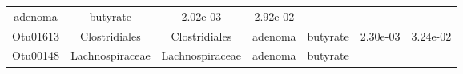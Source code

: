 \documentclass[11pt,]{article}
\begin{document}
\begin{longtable}[]{@{}ccccccc@{}}
\begin{minipage}[t]{0.09\columnwidth}
adenoma\strut
\end{minipage} & \begin{minipage}[t]{0.11\columnwidth}\centering\strut
butyrate\strut
\end{minipage} & \begin{minipage}[t]{0.09\columnwidth}\centering\strut
2.02e-03\strut
\end{minipage} & \begin{minipage}[t]{0.09\columnwidth}\centering\strut
2.92e-02\strut
\end{minipage}\tabularnewline
\begin{minipage}[t]{0.09\columnwidth}\centering\strut
Otu01613\strut
\end{minipage} & \begin{minipage}[t]{0.17\columnwidth}\centering\strut
Clostridiales\strut
\end{minipage} & \begin{minipage}[t]{0.17\columnwidth}\centering\strut
Clostridiales\strut
\end{minipage} & \begin{minipage}[t]{0.09\columnwidth}\centering\strut
adenoma\strut
\end{minipage} & \begin{minipage}[t]{0.11\columnwidth}\centering\strut
butyrate\strut
\end{minipage} & \begin{minipage}[t]{0.09\columnwidth}\centering\strut
2.30e-03\strut
\end{minipage} & \begin{minipage}[t]{0.09\columnwidth}\centering\strut
3.24e-02\strut
\end{minipage}\tabularnewline
\begin{minipage}[t]{0.09\columnwidth}\centering\strut
Otu00148\strut
\end{minipage} & \begin{minipage}[t]{0.17\columnwidth}\centering\strut
Lachnospiraceae\strut
\end{minipage} & \begin{minipage}[t]{0.17\columnwidth}\centering\strut
Lachnospiraceae\strut
\end{minipage} & \begin{minipage}[t]{0.09\columnwidth}\centering\strut
adenoma\strut
\end{minipage} & \begin{minipage}[t]{0.11\columnwidth}\centering\strut
butyrate\strut
\end{minipage} & \begin{minipage}[t]{0.09\columnwidth}\centering\strut

\end{minipage}
\end{longtable}
\end{document}
